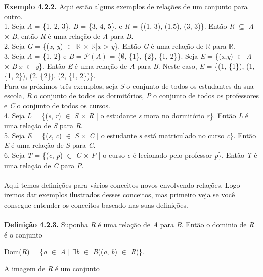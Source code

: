 \textbf{Exemplo 4.2.2.} Aqui estão alguns exemplos de relações de um conjunto para outro.
\\
1. Seja \textit{A} = \{1, 2, 3\}, \textit{B} = \{3, 4, 5\}, e \textit{R} = \{(1, 3), (1,5), (3, 3)\}. Então \textit{R} $\subseteq$ 
\textit{A} $\times$ \textit{B}, então \textit{R} é uma relação de \textit{A} para \textit{B}.
\\
2. Seja \textit{G} = \{(\textit{x}, \textit{y}) $\in$ $\mathbb{R}$ $\times$ $\mathbb{R}$|\textit{x} > \textit{y}\}. Então \textit{G}
é uma relação de $\mathbb{R}$ para $\mathbb{R}$.
\\
3. Seja \textit{A} = \{1, 2\} e \textit{B} = $\mathcal P(A)$ = \{$\emptyset$, \{1\}, \{2\}, \{1, 2\}\}. Seja \textit{E} = 
\{(\textit{x},\textit{y}) $\in$ \textit{A} $\times$ \textit{B}|\textit{x} $\in$ \textit{y}\}. Então \textit{E} é uma relação de 
\textit{A} para \textit{B}. Neste caso, \textit{E} = \{(1, \{1\}), (1, \{1, 2\}), (2, \{2\}), (2, \{1, 2\})\}.
\\	
Para os próximos três exemplos, seja \textit{S} o conjunto de todos os estudantes da sua escola, \textit{R} o conjunto de todos os
dormitórios, \textit{P} o conjunto de todos os professores e \textit{C} o conjunto de todos os cursos.
\\
4. Seja \textit{L} = \{(\textit{s}, \textit{r}) $\in$ \textit{S} $\times$ \textit{R} | o estudante \textit{s} mora no dormitório 
\textit{r}\}. Então \textit{L} é uma relação de \textit{S} para \textit{R}.
\\
5. Seja \textit{E} = \{(\textit{s}, \textit{c}) $\in$ \textit{S} $\times$ \textit{C} | o estudante \textit{s} está matriculado no 
curso \textit{c}\}. Então \textit{E} é uma relação de \textit{S} para \textit{C}.
\\
6. Seja \textit{T} = \{(\textit{c}, \textit{p}) $\in$ \textit{C} $\times$ \textit{P} | o curso \textit{c} é lecionado pelo professor
\textit{p}\}. Então \textit{T} é uma relação de \textit{C} para \textit{P}.
\\
\\
Aqui temos definições para vários conceitos novos envolvendo relações. Logo iremos dar exemplos ilustrados desses conceitos,
mas primeiro veja se você consegue entender os conceitos baseado nas suas definições.
\\
\\
\textbf{Definição 4.2.3.} Suponha \textit{R} é uma relação de \textit{A} para \textit{B}. Então o dominio de \textit{R} é o
conjunto

\begin{center}
Dom(\textit{R}) = \{\textit{a} $\in$ \textit{A} | $\exists$\textit{b} $\in$ \textit{B}((\textit{a}, \textit{b}) $\in$ \textit{R})\}. 
\end{center}
A imagem de \textit{R} é um conjunto

